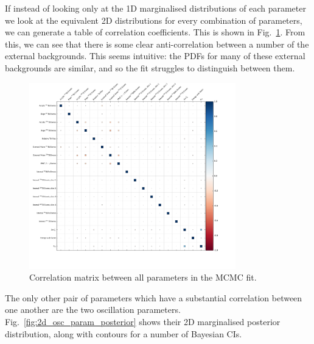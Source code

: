 If instead of looking only at the 1D marginalised distributions of each parameter we look at the equivalent 2D distributions for every combination of parameters, we can generate a table of correlation coefficients. This is shown in Fig.~\ref{fig:corr_plots_params}. From this, we can see that there is some clear anti-correlation between a number of the external backgrounds. This seems intuitive: the PDFs for many of these external backgrounds are similar, and so the fit struggles to distinguish between them.

\begin{figure}
    \centering
    \includegraphics[width=0.8\textwidth]{6_SolarAnalysis/images/corr_coeff.pdf}
    \caption[Correlation matrix between all parameters in the MCMC fit]
    {Correlation matrix between all parameters in the MCMC fit.}
    \label{fig:corr_plots_params}
\end{figure}

The only other pair of parameters which have a substantial correlation between one another are the two oscillation parameters. Fig.~\ref{fig:2d_osc_param_posterior} shows their 2D marginalised posterior distribution, along with contours for a number of Bayesian CIs.

